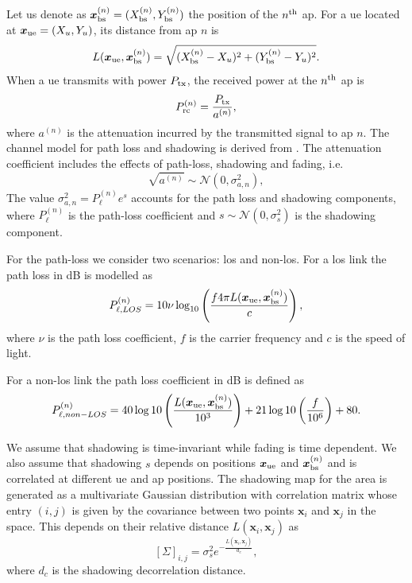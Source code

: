 \documentclass[draftcls,onecolumn,12pt]{IEEEtran}
\begin{document}
Let us denote as $\bm{x}_{\rm bs}^{(n)} =(X_{\rm bs}^{(n)},Y_{\rm bs}^{(n)})$ the position of the $n^{\rm th}$ \ac{ap}. For a \ac{ue} located at $\bm{x}_{\rm ue}=(X_u,Y_u)$, its distance from \ac{ap} $n$ is
\begin{equation}
    L(\bm{x}_{\rm ue},\bm{x}_{\rm bs}^{(n)}) = \sqrt{(X_{\rm bs}^{(n)}-X_u)^2+(Y_{\rm bs}^{(n)}-Y_u)^2}.
\end{equation}
When a \ac{ue} transmits with power $P_{\rm tx}$, the received power at the $n^{\rm th}$ \ac{ap} is
\begin{equation}\label{eq: rec pow}
    P_{\rm rc}^{(n)}= \frac{P_{\rm tx}}{a^{(n)}},
\end{equation}
where $a^{(n)}$ is the attenuation incurred by the transmitted signal to \ac{ap} $n$. The channel model for path loss and shadowing is derived from \cite{3gpp}. The attenuation coefficient includes the effects of path-loss, shadowing and fading, i.e.
\begin{equation}
    \sqrt{a^{(n)}} \sim \mathcal{N}\left(0,\sigma_{a,n}^2\right),
\end{equation}
The value $\sigma_{a,n}^2={P_{\ell}^{(n)}}e^{s}$ accounts for the path loss and shadowing components,  where $P_{\ell}^{(n)}$ is the path-loss coefficient and $s \sim \mathcal{N}(0,\sigma_s^2)$ is the shadowing component.

For the path-loss we consider two scenarios: \ac{los} and non-\ac{los}. For a \ac{los} link the path loss in dB is modelled as
\begin{equation}\label{eq:los}
    P_{\ell,LOS}^{(n)} = 10 \nu \log_{10}\left(\frac{f 4\pi L(\bm{x}_{\rm ue},\bm{x}_{\rm bs}^{(n)})}{c}\right),
\end{equation}
where $\nu$ is the path loss coefficient, $f$ is the carrier frequency and $c$ is the speed of light. 

For a  non-\ac{los} link the path loss coefficient in dB is defined as
\begin{equation}
    P_{\ell, non-LOS}^{(n)} = 40\log10\left (\frac{L(\bm{x}_{\rm ue},\bm{x}_{\rm bs}^{(n)})}{10^3}\right ) + 21\log10\left(\frac{f}{10^6}\right) + 80.
\end{equation}

We assume that shadowing is time-invariant while fading is time dependent. We also assume that shadowing $s$ depends on positions $\bm{x}_{\rm ue}$ and $\bm{x}_{\rm bs}^{(n)}$ and is correlated at different \ac{ue} and \ac{ap} positions. The shadowing map for the area is generated as a multivariate Gaussian distribution with correlation matrix whose entry $(i,j)$ is given by the covariance between two points $\bm{x}_i$ and $\bm{x}_j$ in the space. This depends on their relative distance $L(\bm{x}_i,\bm{x}_j)$ as
\begin{equation}\label{eq: coor mat}
    \left[ \Sigma \right]_{i,j}= \sigma_s^2e^{-\frac{L(\bm{x}_i,\bm{x}_j)}{d_c}},
\end{equation}
where $d_c$ is the shadowing decorrelation distance. 
\end{document}
